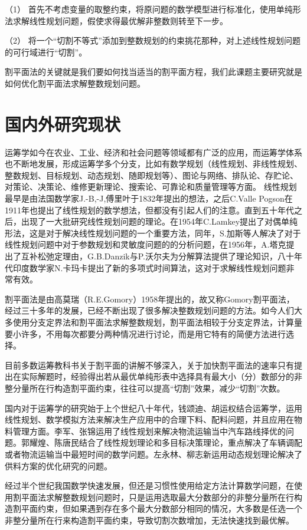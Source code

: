 （1）	首先不考虑变量的取整约束，将原问题的数学模型进行标准化，使用单纯形法求解线性规划问题，假使求得最优解非整数则转至下一步。

（2）	将一个“切割不等式”添加到整数规划的约束挑花那种，对上述线性规划问题的可行域进行“切割”。

割平面法的关键就是我们要如何找当适当的割平面方程，我们此课题主要研究就是如何优化割平面法求解整数规划问题。

	
 
	\section{国内外研究现状}
	
	运筹学如今在农业、工业、经济和社会问题等领域都有广泛的应用，而运筹学体系也不断地发展，形成运筹学多个分支，比如有数学规划（线性规划、非线性规划、整数规划、目标规划、动态规划、随即规划等）、图论与网络、排队论、存贮论、对策论、决策论、维修更新理论、搜索论、可靠论和质量管理等方面。
线性规划最早是由法国数学家J.-B,-J,傅里叶于1832年提出的想法，之后C.Valle Pogson在1911年也提出了线性规划的数学想法，但都没有引起人们的注意。直到五十年代之后，出现了一大批研究线性规划问题的理论。在1954年C.Lamkey提出了对偶单纯形法，这是对于解决线性规划问题的一个重要方法，同年，S.加斯等人解决了对于线性规划问题中对于参数规划和灵敏度问题的的分析问题，在1956年，A.塔克提出了互补松弛定理由，G.B.Danzik与P.沃尔夫为分解算法提供了理论知识，八十年代印度数学家N.卡玛卡提出了新的多项式时间算法，这对于求解线性规划问题非常有效。

割平面法是由高莫瑞（R.E.Gomory）1958年提出的，故又称Gomory割平面法，经过三十多年的发展，已经不断出现了很多解决整数规划问题的方法。如今人们大多使用分支定界法和割平面法求解整数规划，割平面法相较于分支定界法，计算量要小许多，不用每次都要分两种情况进行讨论，而是用它特有的简便方法进行选择。

目前多数运筹教科书关于割平面的讲解不够深入，关于加快割平面法的速率只有提出在实际解题时，经验得出若从最优单纯形表中选择具有最大小（分）数部分的非整分量所在行构造割平面约束，往往可以提高“切割”效果，减少“切割”次数。

国内对于运筹学的研究始于上个世纪八十年代，钱颂迪、胡运权结合运筹学，运用线性规划、数学模拟方法来解决生产应用中的合理下料、配料问题，并且应用在物料管理方面。李军、张锦运用了线性规划来解决物流运输当中汽车路线择优的问题。郭耀煌、陈唐民结合了线性规划理论和多目标决策理论，重点解决了车辆调配或者物流运输当中最短时间的数学问题。左永林、柳志新运用动态规划理论解决了供料方案的优化研究的问题。

经过半个世纪我国数学快速发展，但还是习惯性使用给定方法计算数学问题，在使用割平面法求解整数规划问题时，只是运用选取最大分数部分的非整分量所在行构造割平面约束，但如果遇到存在多个最大分数部分相同的情况，大多数是任选一个非整分量所在行来构造割平面约束，导致切割次数增加，无法快速找到最优解。

